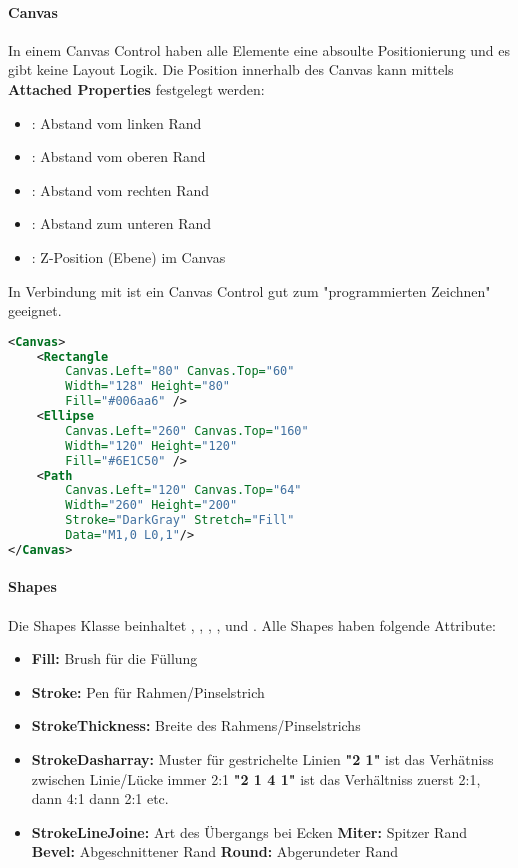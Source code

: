\paragraph{Canvas} In einem Canvas Control haben alle Elemente eine absoulte Positionierung und es gibt keine Layout Logik. Die Position innerhalb des Canvas kann mittels \textbf{Attached Properties} festgelegt werden:
\begin{itemize}
\item {}: Abstand vom linken Rand
\item {}: Abstand vom oberen Rand
\item {}: Abstand vom rechten Rand
\item {}: Abstand zum unteren Rand
\item {}: Z-Position (Ebene) im Canvas
\end{itemize}
In Verbindung mit  ist ein Canvas Control gut zum "{}programmierten Zeichnen"{} geeignet.
\begin{lstlisting}[language=xml]
<Canvas>
    <Rectangle
        Canvas.Left="80" Canvas.Top="60"
        Width="128" Height="80"
        Fill="#006aa6" />
    <Ellipse
        Canvas.Left="260" Canvas.Top="160"
        Width="120" Height="120"
        Fill="#6E1C50" />
    <Path
        Canvas.Left="120" Canvas.Top="64"
        Width="260" Height="200"
        Stroke="DarkGray" Stretch="Fill"
        Data="M1,0 L0,1"/>
</Canvas>
\end{lstlisting}
\paragraph{Shapes} Die Shapes Klasse beinhaltet , , , ,  und . Alle Shapes haben folgende Attribute:
\begin{itemize}
\item \textbf{Fill:} Brush für die Füllung
\item \textbf{Stroke:} Pen für Rahmen/Pinselstrich
\item \textbf{StrokeThickness:} Breite des Rahmens/Pinselstrichs
\item \textbf{StrokeDasharray:} Muster für gestrichelte Linien
    \subitem \textbf{"{}2 1"{}} ist das Verhätniss zwischen Linie/Lücke immer 2:1
    \subitem \textbf{"{}2 1 4 1"{}} ist das Verhältniss zuerst 2:1, dann 4:1 dann 2:1 etc.
\item \textbf{StrokeLineJoine:} Art des Übergangs bei Ecken
    \subitem \textbf{Miter:} Spitzer Rand
    \subitem \textbf{Bevel:} Abgeschnittener Rand
    \subitem  \textbf{Round:} Abgerundeter Rand
\end{itemize}
